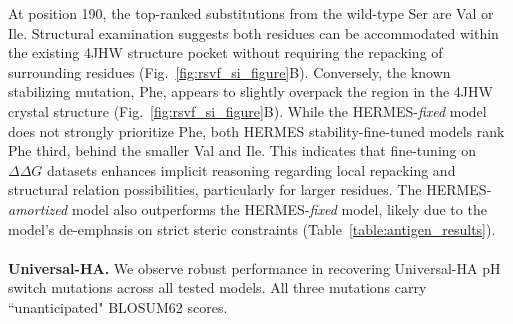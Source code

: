 At position 190, the top-ranked substitutions from the wild-type Ser are Val or Ile. Structural
examination suggests both residues can be accommodated within the existing 4JHW structure pocket
without requiring the repacking of surrounding residues (Fig.~\ref{fig:rsvf_si_figure}B).
Conversely, the known stabilizing mutation, Phe, appears to slightly overpack the region in the 4JHW
crystal structure (Fig.~\ref{fig:rsvf_si_figure}B). While the HERMES-\textit{fixed} model does not
strongly prioritize Phe, both HERMES stability-fine-tuned models rank Phe third, behind the smaller
Val and Ile.
 This indicates that fine-tuning on $\Delta\Delta G$ datasets enhances implicit reasoning regarding
 local repacking and structural relation possibilities, particularly for larger residues. The
 HERMES-\textit{amortized} model also outperforms the HERMES-\textit{fixed} model, likely due to the
 model's de-emphasis on strict steric constraints (Table~\ref{table:antigen_results}).\\
\\
\textbf{Universal-HA.} 
We observe robust performance in recovering Universal-HA pH switch mutations across all tested
models. All three mutations carry ``unanticipated" BLOSUM62 scores.

